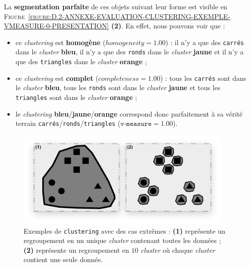 		La \textbf{segmentation parfaite} de ces objets suivant leur forme est visible en \textsc{Figure~\ref{figure:D.2-ANNEXE-EVALUATION-CLUSTERING-EXEMPLE-VMEASURE-0-PRESENTATION}} \textbf{(2)}.
		En effet, nous pouvons voir que :
		\begin{itemize}
			\item ce \textit{clustering} est \textbf{homogène} ($homogeneity=1.00$) : il n'y a que des \texttt{carrés} dans le \textit{cluster} \textbf{\textcolor{colorSilverLakeBlue}{bleu}}, il n'y a que des \texttt{ronds} dans le \textit{cluster} \textbf{\textcolor{colorMinionYellow}{jaune}} et il n'y a que des \texttt{triangles} dans le \textit{cluster} \textbf{\textcolor{colorCarrotOrange}{orange}} ;
			\item ce \textit{clustering} est \textbf{complet} ($completeness=1.00$) : tous les \texttt{carrés} sont dans le \textit{cluster} \textbf{\textcolor{colorSilverLakeBlue}{bleu}}, tous les \texttt{ronds} sont dans le \textit{cluster} \textbf{\textcolor{colorMinionYellow}{jaune}} et tous les \texttt{triangles} sont dans le \textit{cluster} \textbf{\textcolor{colorCarrotOrange}{orange}} ;
			\item le \textit{clustering} \textbf{\textcolor{colorSilverLakeBlue}{bleu}}/\textbf{\textcolor{colorMinionYellow}{jaune}}/\textbf{\textcolor{colorCarrotOrange}{orange}} correspond donc parfaitement à sa vérité terrain \texttt{carrés}/\texttt{ronds}/\texttt{triangles} ($\texttt{v-measure}=1.00$).
		\end{itemize}
	
		\newpage
		\begin{figure}[H]
			\centering
			\includegraphics[width=0.95\textwidth]{figures/annexe-vmeasure-cas-extremes}
			\caption{
				Exemples de \texttt{clustering} avec des cas extrêmes :
				\textbf{(1)} représente un regroupement en un unique \textit{cluster} contenant toutes les données ;
				\textbf{(2)} représente un regroupement en $10$ \textit{cluster} où chaque \textit{cluster} contient une seule donnée.
			}
			\label{figure:D.2-ANNEXE-EVALUATION-CLUSTERING-EXEMPLE-VMEASURE-1-CAS-EXTREME}
		\end{figure}
		
